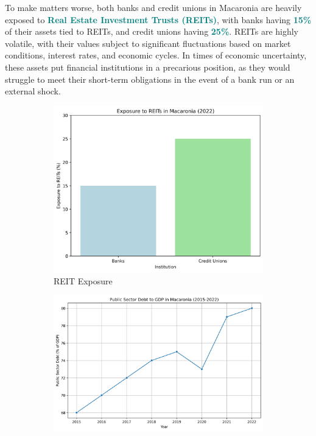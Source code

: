 To make matters worse, both banks and credit unions in Macaronia are heavily exposed to \textbf{\textcolor{teal}{Real Estate Investment Trusts (REITs)}}, 
with banks having \textbf{\textcolor{teal}{15\%}} of their assets tied to REITs, and credit unions having \textbf{\textcolor{teal}{25\%}}. 
REITs are highly volatile, with their values subject to significant fluctuations based on market conditions, 
interest rates, and economic cycles. In times of economic uncertainty, these assets put financial institutions
in a precarious position, as they would struggle to meet their short-term obligations in the event of a bank run
or an external shock.  \textcolor{orange}{\cite{FSB2023GlobalMonitoring}}


\begin{figure}[h]
    \centering
    \begin{subfigure}{0.48\textwidth}
        \centering
        \includegraphics[width=\textwidth]{REIT.png}
        \caption{\small REIT Exposure}
        \label{fig:reit_exposure}
    \end{subfigure}
    \hfill
    \begin{subfigure}{0.48\textwidth}
        \centering
        \includegraphics[width=\textwidth]{graph_2.png}

\end{subfigure}
\end{figure}
